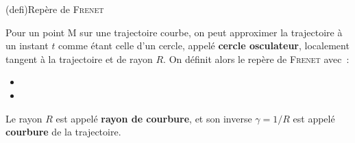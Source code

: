 \documentclass[../../main/main.tex]{subfiles}
\begin{document}
\begin{tcb*}(defi){Repère de \textsc{Frenet}}
  \begin{isd}[righthand ratio=.25]
      Pour un point M sur une trajectoire courbe, on peut approximer la
      trajectoire à un instant $t$ comme étant celle d'un cercle, appelé
      \textbf{cercle osculateur}, localement tangent à la trajectoire et de
      rayon $R$. On définit alors le repère de \textsc{Frenet} avec~:
      \begin{itemize}
        \item {}
        \item
      \end{itemize}
    \tcblower
      \begin{center}
        \vspace{-15pt}
      \end{center}
  \end{isd}
  \smallbreak
	Le rayon $R$ est appelé \textbf{rayon de courbure}, et son inverse $\gamma =
		1/R$ est appelé \textbf{courbure} de la trajectoire.
\end{tcb*}
\end{document}
